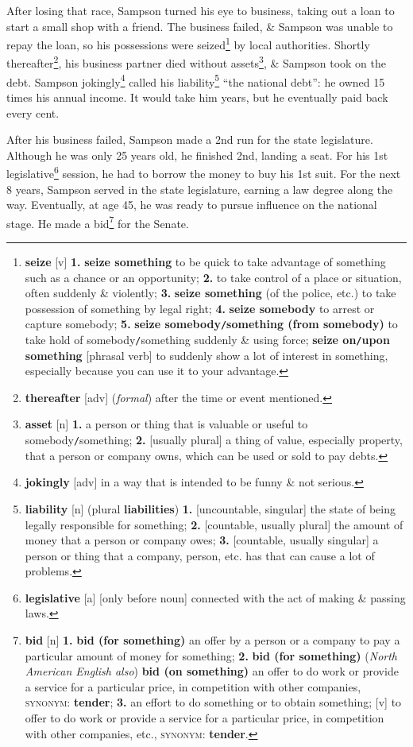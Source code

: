 \documentclass[oneside]{book}
\numberwithin{equation}{section}
\begin{document}
After losing that race, Sampson turned his eye to business, taking out a loan to start a small shop with a friend. The business failed, \& Sampson was unable to repay the loan, so his possessions were seized\footnote{\textbf{seize} [v] \textbf{1.} \textbf{seize something} to be quick to take advantage of something such as a chance or an opportunity; \textbf{2.} to take control of a place or situation, often suddenly \& violently; \textbf{3.} \textbf{seize something} (of the police, etc.) to take possession of something by legal right; \textbf{4.} \textbf{seize somebody} to arrest or capture somebody; \textbf{5.} \textbf{seize somebody\texttt{/}something (from somebody)} to take hold of somebody\texttt{/}something suddenly \& using force; \textbf{seize on\texttt{/}upon something} [phrasal verb] to suddenly show a lot of interest in something, especially because you can use it to your advantage.} by local authorities. Shortly thereafter\footnote{\textbf{thereafter} [adv] (\textit{formal}) after the time or event mentioned.}, his business partner died without assets\footnote{\textbf{asset} [n] \textbf{1.} a person or thing that is valuable or useful to somebody\texttt{/}something; \textbf{2.} [usually plural] a thing of value, especially property, that a person or company owns, which can be used or sold to pay debts.}, \& Sampson took on the debt. Sampson jokingly\footnote{\textbf{jokingly} [adv] in a way that is intended to be funny \& not serious.} called his liability\footnote{\textbf{liability} [n] (plural \textbf{liabilities}) \textbf{1.} [uncountable, singular] the state of being legally responsible for something; \textbf{2.} [countable, usually plural] the amount of money that a person or company owes; \textbf{3.} [countable, usually singular] a person or thing that a company, person, etc. has that can cause a lot of problems.} ``the national debt'': he owned 15 times his annual income. It would take him years, but he eventually paid back every cent.

After his business failed, Sampson made a 2nd run for the state legislature. Although he was only 25 years old, he finished 2nd, landing a seat. For his 1st legislative\footnote{\textbf{legislative} [a] [only before noun] connected with the act of making \& passing laws.} session, he had to borrow the money to buy his 1st suit. For the next 8 years, Sampson served in the state legislature, earning a law degree along the way. Eventually, at age 45, he was ready to pursue influence on the national stage. He made a bid\footnote{\textbf{bid} [n] \textbf{1.} \textbf{bid (for something)} an offer by a person or a company to pay a particular amount of money for something; \textbf{2.} \textbf{bid (for something)} (\textit{North American English also}) \textbf{bid (on something)} an offer to do work or provide a service for a particular price, in competition with other companies, \textsc{synonym}: \textbf{tender}; \textbf{3.} an effort to do something or to obtain something; [v] to offer to do work or provide a service for a particular price, in competition with other companies, etc., \textsc{synonym}: \textbf{tender}.} for the Senate.
\end{document}
